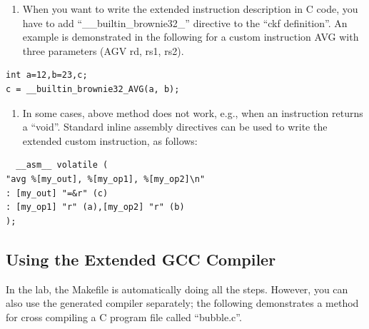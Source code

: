 \begin{enumerate}
\def\labelenumi{\arabic{enumi}.}
\item
  When you want to write the extended instruction description in C code,
  you have to add ``\_\_builtin\_brownie32\_'' directive to the ``ckf
  definition''. An example is demonstrated in the following for a custom
  instruction AVG with three parameters (AGV rd, rs1, rs2).
\end{enumerate}
\begin{lstlisting}
int a=12,b=23,c;  
c = __builtin_brownie32_AVG(a, b);	
\end{lstlisting}
\begin{enumerate}
\def\labelenumi{\arabic{enumi}.}
\setcounter{enumi}{1}
\item
  In some cases, above method does not work, e.g., when an instruction
  returns a ``void''. Standard inline assembly directives can be used to
  write the extended custom instruction, as follows:
\end{enumerate}
\begin{lstlisting}
  __asm__ volatile (
"avg %[my_out], %[my_op1], %[my_op2]\n"
: [my_out] "=&r" (c)
: [my_op1] "r" (a),[my_op2] "r" (b)
);	
\end{lstlisting}
\hypertarget{using-the-extended-gcc-compiler}{%
\subsection{Using the Extended GCC
Compiler}\label{using-the-extended-gcc-compiler}}

In the lab, the Makefile is automatically doing all the steps. However,
you can also use the generated compiler separately; the following
demonstrates a method for cross compiling a C program file called
``bubble.c''.

